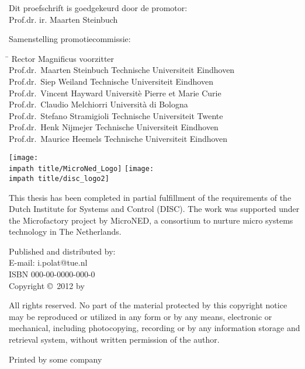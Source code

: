 \newpage %
\thispagestyle{empty}

\noindent Dit proefschrift is goedgekeurd door de promotor:\\
Prof.dr. ir. Maarten Steinbuch\\
\bigskip{}

\noindent Samenstelling promotiecommissie:
\smallskip{}
\noindent
\begin{flushleft}\begin{tabbing}
\hspace*{50mm}\=\kill
Rector Magnificus \> voorzitter\\
Prof.dr.\ Maarten Steinbuch   \> Technische Universiteit Eindhoven\\
Prof.dr.\ Siep Weiland        \> Technische Universiteit Eindhoven\\
Prof.dr.\ Vincent Hayward     \> Universitè Pierre et Marie Curie\\
Prof.dr.\ Claudio Melchiorri  \> Università di Bologna\\
Prof.dr.\ Stefano Stramigioli \> Technische Universiteit Twente\\
Prof.dr.\ Henk Nijmejer       \> Technische Universiteit Eindhoven\\
Prof.dr.\ Maurice Heemels     \> Technische Universiteit Eindhoven\\
\end{tabbing}\end{flushleft}
\smallskip\noindent
{
\flushleft\texttt{[image: \\impath title/MicroNed\_Logo]}\hspace*{0.75cm}
\vspace{1em}
\texttt{[image: \\impath title/disc\_logo2]}
\vspace{1em}


\parbox{\textwidth}{\noindent This thesis has been completed in partial fulfillment of
the requirements of the Dutch Institute for Systems and Control
(DISC). The work was supported under the Microfactory project by
MicroNED, a consortium to nurture micro systems technology in
The Netherlands.
}
\bigskip{}


Published and distributed by: \theauthor \\
E-mail: i.polat@tue.nl\\

\bigskip{}
ISBN 000-00-0000-000-0\\
Copyright \copyright~2012 by \theauthor
}


\bigskip{}
\noindent All rights reserved. No part of the material protected by
this copyright notice may be reproduced or utilized in any form or
by any means, electronic or mechanical, including photocopying,
recording or by any information storage and retrieval system,
without written permission of the author.

\bigskip{}

\noindent Printed by some company
